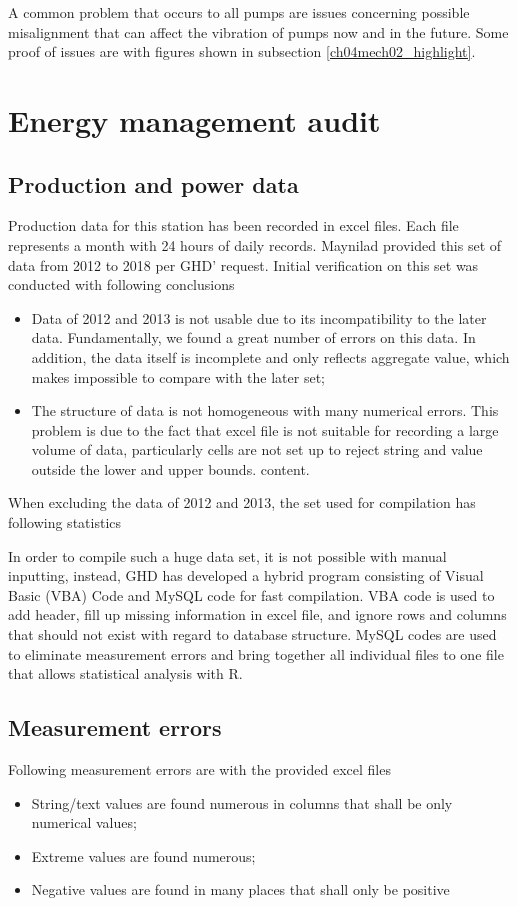 A common problem that occurs to all pumps are issues concerning possible misalignment that can affect the vibration of pumps now and in the future. Some proof of issues are with figures shown in subsection \ref{ch04mech02_highlight}. 

\section{Energy management audit}
\label{46}

\subsection{Production and power data}
Production data for this station has been recorded in excel files. Each file represents a month with 24 hours of daily records. Maynilad provided this set of data from 2012 to 2018 per GHD' request. Initial verification on this set was conducted with following conclusions

\begin{itemize}
	\item Data of 2012 and 2013 is not usable due to its incompatibility to the later data. Fundamentally, we found a great number of errors on this data. In addition, the data itself is incomplete and only reflects aggregate value, which makes impossible to compare with the later set;
	\item The structure of data is not homogeneous with many numerical errors. This problem is due to the fact that excel file is not suitable for recording a large volume of data, particularly cells are not set up to reject string and value outside the lower and upper bounds.
	content.
\end{itemize}

When excluding the data of 2012 and 2013, the set used for compilation has following statistics

In order to compile such a huge data set, it is not possible with manual inputting, instead, GHD has developed a hybrid program consisting of Visual Basic (VBA) Code and MySQL code for fast compilation. VBA code is used to add header, fill up missing information in excel file, and ignore rows and columns that should not exist with regard to database structure. MySQL codes are used to eliminate measurement errors and bring together all individual files to one file that allows statistical analysis with R.
\subsection{Measurement errors}
Following measurement errors are with the provided excel files
\begin{itemize}
\item String/text values are found numerous in columns that shall be only numerical values;
\item Extreme values are found numerous;
\item Negative values are found in many places that shall only be positive
\end{itemize}
